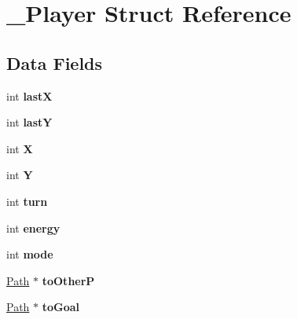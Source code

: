 \hypertarget{struct___player}{}\section{\+\_\+\+Player Struct Reference}
\label{struct___player}
\subsection*{Data Fields}
\begin{DoxyCompactItemize}
\item 
int {\bfseries lastX}\hypertarget{struct___player_a7bb8b2cfc1aec0db2429c600cddccf17}{}\label{struct___player_a7bb8b2cfc1aec0db2429c600cddccf17}

\item 
int {\bfseries lastY}\hypertarget{struct___player_ae135df8cfc9b15d97e97b400a5cbc768}{}\label{struct___player_ae135df8cfc9b15d97e97b400a5cbc768}

\item 
int {\bfseries X}\hypertarget{struct___player_a80c0944640e62d3ed6c5419c1bcc0c88}{}\label{struct___player_a80c0944640e62d3ed6c5419c1bcc0c88}

\item 
int {\bfseries Y}\hypertarget{struct___player_aa482c4cc86a24474e4fb19b5b5978778}{}\label{struct___player_aa482c4cc86a24474e4fb19b5b5978778}

\item 
int {\bfseries turn}\hypertarget{struct___player_aaefa47f4fdf865c2358c22b542a993e4}{}\label{struct___player_aaefa47f4fdf865c2358c22b542a993e4}

\item 
int {\bfseries energy}\hypertarget{struct___player_a4ec8c7cb48771b844a6d50e2150e3f63}{}\label{struct___player_a4ec8c7cb48771b844a6d50e2150e3f63}

\item 
int {\bfseries mode}\hypertarget{struct___player_a1ea5d0cb93f22f7d0fdf804bd68c3326}{}\label{struct___player_a1ea5d0cb93f22f7d0fdf804bd68c3326}

\item 
\hyperlink{struct___path}{Path} $\ast$ {\bfseries to\+OtherP}\hypertarget{struct___player_acb6bf1fa3b8884d0c9ce0b566a534bcc}{}\label{struct___player_acb6bf1fa3b8884d0c9ce0b566a534bcc}

\item 
\hyperlink{struct___path}{Path} $\ast$ {\bfseries to\+Goal}\hypertarget{struct___player_ac7fee391a1ea765fcd9a813684459133}{}\label{struct___player_ac7fee391a1ea765fcd9a813684459133}

\end{DoxyCompactItemize}


